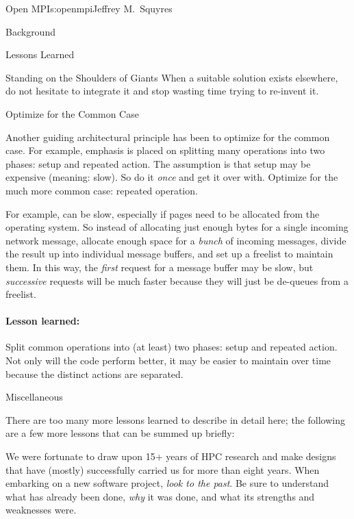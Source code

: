 \begin{aosachapter}{Open MPI}{s:openmpi}{Jeffrey M.\ Squyres}
\begin{aosasect1}{Background}
\begin{aosasect1}{Lessons Learned}
\begin{aosasect2}{Standing on the Shoulders of Giants}
When a suitable solution exists elsewhere, do not hesitate to integrate
it and stop wasting time trying to re-invent it.

\end{aosasect2}


\begin{aosasect2}{Optimize for the Common Case}

Another guiding architectural principle has been to optimize for the
common case.  
% 
For example, emphasis is placed on splitting many operations into two
phases: setup and repeated action.  The assumption is that setup may
be expensive (meaning: slow).  So do it \emph{once} and get it over
with.
%
Optimize for the much more common case: repeated operation.

For example,  can be slow, especially if pages need to
be allocated from the operating system.  So instead of allocating just
enough bytes for a single incoming network message, allocate enough
space for a \emph{bunch} of incoming messages, divide the result up
into individual message buffers, and set up a freelist to maintain
them.  In this way, the \emph{first} request for a message buffer may
be slow, but \emph{successive} requests will be much faster because
they will just be de-queues from a freelist.


\paragraph{Lesson learned:} Split common operations into (at least)
two phases: setup and repeated action.  Not only will the code perform
better, it may be easier to maintain over time because the distinct
actions are separated.

\end{aosasect2}


\begin{aosasect2}{Miscellaneous}

There are too many more lessons learned to describe in detail here;
the following are a few more lessons that can be summed up briefly:

\begin{aosaitemize}
\item We were fortunate to draw upon 15+ years of HPC research and
  make designs that have (mostly) successfully carried us for more
  than eight years.  When embarking on a new software project,
  \emph{look to the past}.  Be sure to understand what has already
  been done, \emph{why} it was done, and what its strengths and
  weaknesses were.


\end{aosaitemize}
\end{aosasect2}
\end{aosasect1}
\end{aosasect1}
\end{aosachapter}
